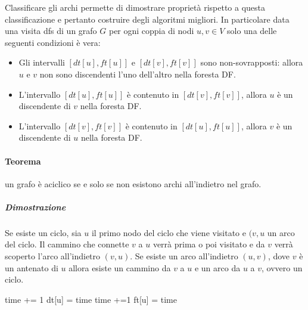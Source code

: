 Classificare gli archi permette di dimostrare propriet\`a rispetto a questa classificazione e pertanto costruire degli algoritmi migliori. In particolare 
data una visita dfs di un grafo $G$ per ogni coppia di nodi $u, v\in V$ solo una delle seguenti condizioni \`e vera:
\begin{itemize}
\item Gli intervalli $[dt[u], ft[u]]$ e $[dt[v], ft[v]]$ sono non-sovrapposti: allora $u$ e $v$ non sono discendenti l'uno dell'altro nella foresta DF.
\item L'intervallo $[dt[u], ft[u]]$ \`e contenuto in $[dt[v], ft[v]]$, allora $u$ \`e un discendente di $v$ nella foresta DF.
\item L'intervallo $[dt[v], ft[v]]$ \`e contenuto in $[dt[u], ft[u]]$, allora $v$ \`e un discendente di $u$ nella foresta DF.
\end{itemize}
\paragraph{Teorema}
un grafo \`e aciclico se e solo se non esistono archi all'indietro nel grafo.
\subparagraph{Dimostrazione}
Se esiste un ciclo, sia $u$ il primo nodo del ciclo che viene visitato e $(v, u$ un arco del ciclo. Il cammino che connette $v$ a $u$ verr\`a prima o poi
visitato e da $v$ verr\`a scoperto l'arco all'indietro $(v, u)$. Se esiste un arco all'indietro $(u, v)$, dove $v$ \`e un antenato di $u$ allora esiste
un cammino da $v$ a $u$ e un arco da $u$ a $v$, ovvero un ciclo.
\begin{algorithm}
\DontPrintSemicolon
{}

\caption{\protect{}}

time += 1\;
dt[u] = time\;
time +=1\;
ft[u] = time\;
\Return \False\;
\end{algorithm}

